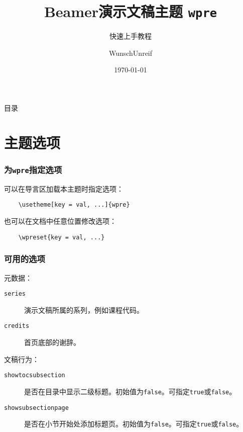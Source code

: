 \documentclass[no-math, aspectratio=1610, 10pt]{beamer}
\title{Beamer演示文稿主题 \texttt{wpre}}
\subtitle{快速上手教程}
\author{WunschUnreif}
\institute{Basics, SJTU}
\date{\today}
\begin{document}
    \maketitle

    \begin{frame}{目录}
        \tableofcontents
    \end{frame}

    \section{主题选项}

    \begin{frame}[fragile]
        \frametitle{为\texttt{wpre}指定选项}
        可以在导言区加载本主题时指定选项：
        \begin{verbatim}
    \usetheme[key = val, ...]{wpre}
        \end{verbatim}
        也可以在文档中任意位置修改选项： 
        \begin{verbatim}
    \wpreset{key = val, ...}
        \end{verbatim}
    \end{frame}

    \begin{frame}
        \frametitle{可用的选项}
    
        元数据：
        \begin{description}
            \item[\texttt{series}] 演示文稿所属的系列，例如课程代码。
            \item[\texttt{credits}] 首页底部的谢辞。
        \end{description}

        文稿行为：
        \begin{description}
            \item[\texttt{showtocsubsection}] 是否在目录中显示二级标题。初始值为\texttt{false}。可指定\texttt{true}或\texttt{false}。
            \item[\texttt{showsubsectionpage}] 是否在小节开始处添加标题页。初始值为\texttt{false}。可指定\texttt{true}或\texttt{false}。
        \end{description}
    
    \end{frame}
\end{document}
